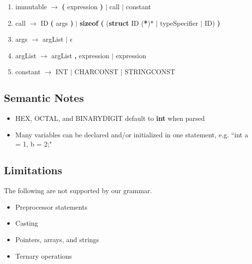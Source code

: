 \documentclass{article}
\begin{document}
\begin{enumerate}
\item immutable $\rightarrow$ 
    \textbf{(} expression \textbf{)} 
    $|$ call 
    $|$ constant

\item call $\rightarrow$ 
    ID \textbf{(} args \textbf{)}
    $|$ \textbf{sizeof (} (\textbf{struct} ID (\textbf{*})* $|$ typeSpecifier $|$ ID) \textbf{)}

\item args $\rightarrow$ 
    argList $|$ $\epsilon$

\item argList $\rightarrow$ 
    argList \textbf{,} expression $|$ expression

\item constant $\rightarrow$ 
    INT $|$ CHARCONST $|$ STRINGCONST
\end{enumerate}

\subsection{Semantic Notes}
\begin{itemize}
    \item HEX, OCTAL, and BINARYDIGIT default to \textbf{int} when parsed
    \item Many variables can be declared and/or initialized in one statement, e.g. ``int a = 1, b = 2;"
    
    
\end{itemize}

\subsection{Limitations}
The following are not supported by our grammar.
\begin{itemize}
    \item Preprocessor statements
    \item Casting
    \item Pointers, arrays, and strings
    \item Ternary operations
\end{itemize}
\end{document}
